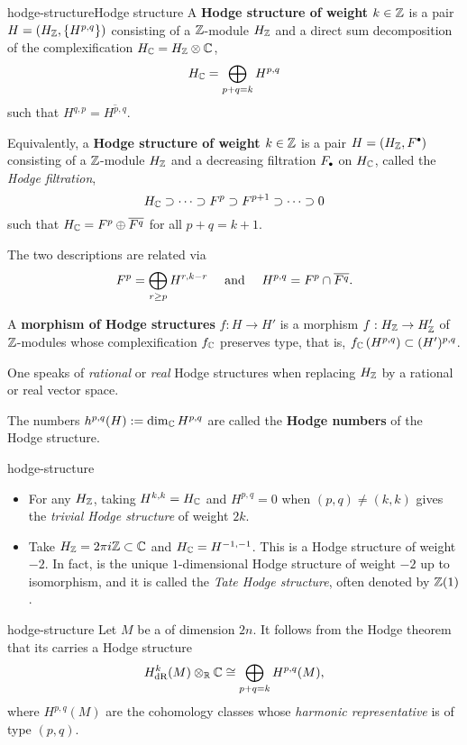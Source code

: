 \begin{topic}{hodge-structure}{Hodge structure}
    A \textbf{Hodge structure of weight $k \in \mathbb{Z}$} is a pair $H = (H_{\mathbb{Z}}, \{ H^{p, q} \})$ consisting of a $\mathbb{Z}$-module $H_{\mathbb{Z}}$ and a direct sum decomposition of the complexification $H_{\mathbb{C}} = H_{\mathbb{Z}} \otimes \mathbb{C}$,
    \[ H_{\mathbb{C}} = \bigoplus_{p + q = k} H^{p, q} \]
    such that $H^{q, p} = \overline{H^{p, q}}$.

    Equivalently, a \textbf{Hodge structure of weight $k \in \mathbb{Z}$} is a pair $H = (H_\ZZ, F^\bdot)$ consisting of a $\mathbb{Z}$-module $H_{\mathbb{Z}}$ and a decreasing filtration $F_\bdot$ on $H_{\mathbb{C}}$, called the \textit{Hodge filtration},
    \[ H_{\mathbb{C}} \supset \cdots \supset F^p \supset F^{p + 1} \supset \cdots \supset 0 \]
    such that $H_{\mathbb{C}} = F^p \oplus \overline{F^q}$ for all $p + q = k + 1$.

    The two descriptions are related via
    \[ F^p = \bigoplus_{r \ge p} H^{r, k - r} \quad \textup{ and } \quad H^{p, q} = F^p \cap \overline{F^q} . \]

    A \textbf{morphism of Hodge structures} $f : H \to H'$ is a morphism $f : H_{\mathbb{Z}} \to H'_{\mathbb{Z}}$ of $\mathbb{Z}$-modules whose complexification $f_{\mathbb{C}}$ preserves type, that is, $f_{\mathbb{C}}\left(H^{p, q}\right) \subset (H')^{p, q}$.
    
    One speaks of \textit{rational} or \textit{real} Hodge structures when replacing $H_{\mathbb{Z}}$ by a rational or real vector space.
        
    The numbers $h^{p, q}(H) := \dim_{\mathbb{C}} H^{p, q}$ are called the \textbf{Hodge numbers} of the Hodge structure.
\end{topic}

\begin{example}{hodge-structure}
    \begin{itemize}
        \item For any $H_{\mathbb{Z}}$, taking $H^{k, k} = H_{\mathbb{C}}$ and $H^{p, q} = 0$ when $(p, q) \ne (k, k)$ gives the \textit{trivial Hodge structure} of weight $2k$.
        \item Take $H_{\mathbb{Z}} = 2 \pi i \mathbb{Z} \subset \mathbb{C}$ and $H_{\mathbb{C}} = H^{-1, -1}$. This is a Hodge structure of weight $-2$. In fact, is the unique $1$-dimensional Hodge structure of weight $-2$ up to isomorphism, and it is called the \textit{Tate Hodge structure}, often denoted by $\mathbb{Z}(1)$.
    \end{itemize}
\end{example}

\begin{example}{hodge-structure}
    Let $M$ be a  of dimension $2n$. It follows from the Hodge theorem that its  carries a Hodge structure
    \[ H_\textup{dR}^k(M) \otimes_{\mathbb{R}} \mathbb{C} \cong \bigoplus_{p + q = k} H^{p, q}(M) , \]
    where $H^{p, q}(M)$ are the cohomology classes whose \textit{harmonic representative} is of type $(p, q)$.
\end{example}


